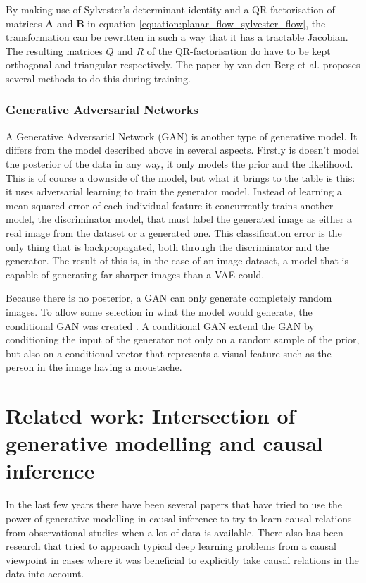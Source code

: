 \documentclass{article}
\newcommand{\bA}{\mathbf{A}}
\newcommand{\bB}{\mathbf{B}}
\begin{document}
By making use of Sylvester's determinant identity and a QR-factorisation of matrices $\bA$ and $\bB$ in equation \ref{equation:planar_flow_sylvester_flow}, the transformation can be rewritten in such a way that it has a tractable Jacobian. The resulting matrices $Q$ and $R$ of the QR-factorisation do have to be kept orthogonal and triangular respectively. The paper by van den Berg et al. proposes several methods to do this during training.

\subsubsection*{Generative Adversarial Networks}
A Generative Adversarial Network (GAN) is another type of generative model\cite{goodfellow2014generative}. It differs from the model described above in several aspects. Firstly is doesn't model the posterior of the data in any way, it only models the prior and the likelihood. This is of course a downside of the model, but what it brings to the table is this: it uses adversarial learning to train the generator model. Instead of learning a mean squared error of each individual feature it concurrently trains another model, the discriminator model, that must label the generated image as either a real image from the dataset or a generated one. This classification error is the only thing that is backpropagated, both through the discriminator and the generator. The result of this is, in the case of an image dataset, a model that is capable of generating far sharper images than a VAE could. 

Because there is no posterior, a GAN can only generate completely random images. To allow some selection in what the model would generate, the conditional GAN was created \cite{mirza2014conditional}. A conditional GAN extend the GAN by conditioning the input of the generator not only on a random sample of the prior, but also on a conditional vector that represents a visual feature such as the person in the image having a moustache.  



\section{Related work: Intersection of generative modelling and causal inference}
In the last few years there have been several papers that have tried to use the power of generative modelling in causal inference to try to learn causal relations from observational studies when a lot of data is available. There also has been research that tried to approach typical deep learning problems from a causal viewpoint in cases where it was beneficial to explicitly take causal relations in the data into account.
\end{document}
